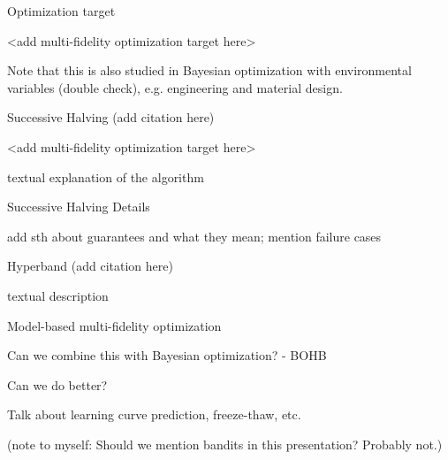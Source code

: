 \documentclass[main]{subfiles}
\begin{document}
\begin{frame}[c]{Optimization target}

<add multi-fidelity optimization target here>

Note that this is also studied in Bayesian optimization with environmental variables (double check), e.g. engineering and material design. 

\end{frame}
\begin{frame}[c]{Successive Halving (add citation here)}

<add multi-fidelity optimization target here>

textual explanation of the algorithm
\end{frame}
\begin{frame}[c]{Successive Halving Details}

add sth about guarantees and what they mean; mention failure cases

\end{frame}
\begin{frame}[c]{Hyperband (add citation here)}

textual description

\end{frame}
\begin{frame}[c]{Model-based multi-fidelity optimization}

Can we combine this with Bayesian optimization? - BOHB


\end{frame}
\begin{frame}[c]{Can we do better?}

Talk about learning curve prediction, freeze-thaw, etc.

(note to myself: Should we mention bandits in this presentation? Probably not.)

\end{frame}
\end{document}
